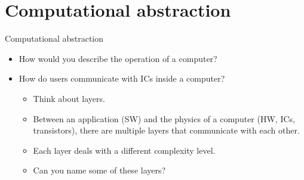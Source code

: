 %
%
%

\section{Computational abstraction} 
\begin{frame}{Computational abstraction}
\begin{itemize}
  \item How would you describe the operation of a computer?
  \item How do users communicate with \acp{IC} inside a computer?
  \pauseprint
  \begin{itemize}
  \item Think about layers.
  \item Between an application (\ac{SW}) and the physics of a computer (\ac{HW}, \acp{IC}, transistors), there are multiple layers that communicate with each other.
  \item Each layer deals with a different complexity level.
  \item Can you name some of these layers?
  \end{itemize}
\end{itemize}
\end{frame}



